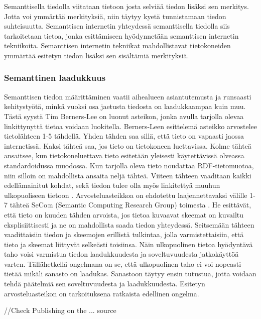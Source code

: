 \documentclass[finnish, 12pt, a4paper, elec, utf8, pdfa, online]{aaltothesis}
\begin{document}
Semanttisella tiedolla viitataan tietoon josta selviää tiedon lisäksi sen merkitys. Jotta voi ymmärtää merkityksiä, niin täytyy kyetä tunnistamaan tiedon suhteisuutta. Semanttisen internetin yhteydessä semanttisella tiedolla siis tarkoitetaan tietoa, jonka esittämiseen hyödynnetään semanttisen internetin tekniikoita. Semanttisen internetin tekniikat mahdollistavat tietokoneiden ymmärtää esitetyn tiedon lisäksi sen sisältämiä merkityksiä.



\subsubsection{Semanttinen laadukkuus} %
Semanttisen tiedon määrittäminen vaatii aihealueen asiantutemusta ja runsaasti kehitystyötä, minkä vuoksi osa jaetusta tiedosta on laadukkaampaa kuin muu. Tästä syystä Tim Berners-Lee on luonut asteikon, jonka avulla tarjolla olevaa linkittynyttä tietoa voidaan luokitella. Berners-Leen esittelemä asteikko arvostelee tietolähteen 1-5 tähdellä. Yhden tähden saa sillä, että tieto on vapaasti jaossa internetissä. Kaksi tähteä saa, jos tieto on tietokoneen luettavissa. Kolme tähteä ansaitsee, kun tietokoneluettava tieto esitetään yleisesti käytettävissä olveassa standardoidussa muodossa. Kun tarjolla oleva tieto noudattaa RDF-tietomuotoa, niin silloin on mahdollista ansaita neljä tähteä. Viiteen tähteen vaaditaan kaikki edellämainitut kohdat, sekä tiedon tulee olla myös linkitettyä muuhun ulkopuoliseen tietoon \cite{Tim-BL}. Arvosteluasteikkoa on ehdotettu laajennettavaksi välille 1-7 tähteä SeCo:n (Semantic Computing Research Group) toimesta \cite{SeCo_stars}. He esittävät, että tieto on kuuden tähden arvoista, jos tietoa kuvaavat skeemat on kuvailtu eksplisiittisesti ja ne on mahdollista saada tiedon yhteydessä. Seitsemään tähteen vaadittaisiin tiedon ja skeemojen erillistä tulkintaa, jolla varmistettaisiin, että tieto ja skeemat liittyvät selkeästi toisiinsa. Näin ulkopuolinen tietoa hyödyntävä taho voisi varmistua tiedon laadukkuudesta ja soveltuvuudesta jatkokäyttöä varten. Tällähetkellä ongelmana on se, että ulkopuolinen taho ei voi nopeasti tietää mikäli sanasto on laadukas. Sanastoon täytyy ensin tutustua, jotta voidaan tehdä päätelmiä sen soveltuvuudesta ja laadukkuudesta. Esitetyn arvosteluasteikon on tarkoituksena ratkaista edellinen ongelma.

//Check Publishing on the ... source
\end{document}
